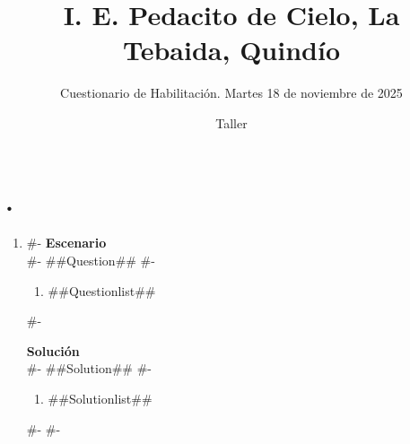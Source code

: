 \documentclass[a4paper,12pt]{article}
\title{I. E. Pedacito de Cielo, La Tebaida, Quindío}
\author{Cuestionario de Habilitación. Martes 18 de noviembre de 2025}
\date{Taller \myID}
\begin{document}
\maketitle

\section*{.}


\begin{enumerate}[label=\arabic*.]
#-
  \item
#-
  \textbf{Escenario}\\
#-
  ##Question##
#-
  \begin{enumerate}[label=(\alph*)]
    \item ##Questionlist##
  \end{enumerate}
#-

  \textbf{Solución}\\
#-
  ##Solution##
#-
  \begin{enumerate}[label=(\alph*)]
    \item ##Solutionlist##
  \end{enumerate}
#-
#-
\end{enumerate}
\end{document}
